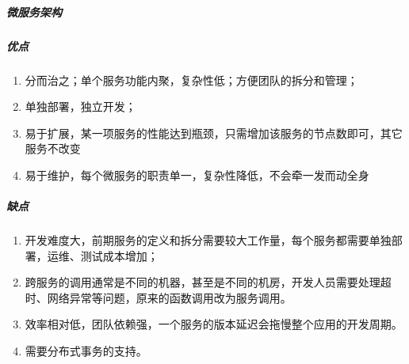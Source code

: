 \documentclass[letterpaper,10pt,english]{sphinxmanual}
\begin{document}
\subparagraph{微服务架构}
\label{\detokenize{chapter_idea/understand_tech:id25}}\label{\detokenize{chapter_idea/understand_tech:id24}}\label{\detokenize{chapter_idea/understand_tech:id26}}

\subparagraph{优点}
\label{\detokenize{chapter_idea/understand_tech:id27}}\begin{enumerate}
%
\item {} 
分而治之；单个服务功能内聚，复杂性低；方便团队的拆分和管理；

\item {} 
单独部署，独立开发；

\item {} 
易于扩展，某一项服务的性能达到瓶颈，只需增加该服务的节点数即可，其它服务不改变

\item {} 
易于维护，每个微服务的职责单一，复杂性降低，不会牵一发而动全身

\end{enumerate}


\subparagraph{缺点}
\label{\detokenize{chapter_idea/understand_tech:id28}}\begin{enumerate}
%
\item {} 
开发难度大，前期服务的定义和拆分需要较大工作量，每个服务都需要单独部署，运维、测试成本增加；

\item {} 
跨服务的调用通常是不同的机器，甚至是不同的机房，开发人员需要处理超时、网络异常等问题，原来的函数调用改为服务调用。

\item {} 
效率相对低，团队依赖强，一个服务的版本延迟会拖慢整个应用的开发周期。

\item {} 
需要分布式事务的支持。

\end{enumerate}
\end{document}
